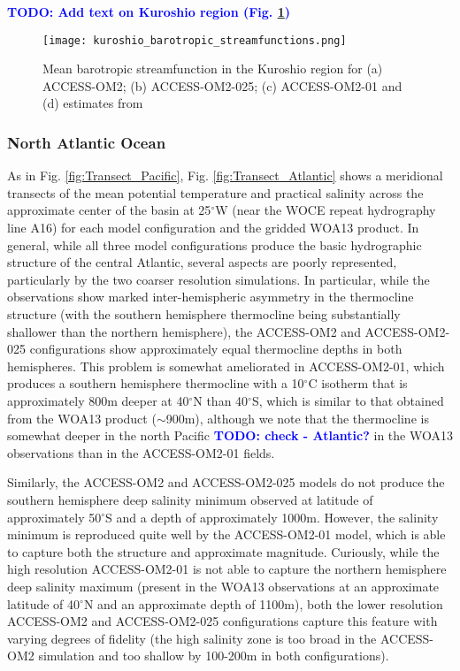 \documentclass[gmd, manuscript]{copernicus}
\newcommand{\TODO}[1]{\textcolor{blue}{\textsf{\textbf{TODO: #1}}}}
\begin{document}
\TODO{Add text on Kuroshio region (Fig. \ref{fig:kuroshio})}


\begin{figure}[t]
\texttt{[image: kuroshio\_barotropic\_streamfunctions.png]}
\caption{Mean barotropic streamfunction in the Kuroshio region for (a)  ACCESS-OM2; (b) ACCESS-OM2-025; (c) ACCESS-OM2-01 and (d) estimates from \citep{cdvo:2016} \label{fig:kuroshio}}
\end{figure}

\subsubsection{North Atlantic Ocean}

As in Fig. \ref{fig:Transect_Pacific}, Fig. \ref{fig:Transect_Atlantic} shows a meridional transects of the mean potential temperature and practical salinity across the approximate center of the basin at 25$^{\circ}$W (near the WOCE repeat hydrography line A16) for each model configuration and the gridded WOA13 product. In general, while all three model configurations produce the basic hydrographic structure of the central Atlantic, several aspects are poorly represented, particularly by the two coarser resolution simulations. In particular, while the observations show marked inter-hemispheric asymmetry in the thermocline structure (with the southern hemisphere thermocline being substantially shallower than the northern hemisphere), the ACCESS-OM2 and ACCESS-OM2-025 configurations show approximately equal thermocline depths in both hemispheres. This problem is somewhat ameliorated in ACCESS-OM2-01, which produces a southern hemisphere thermocline with a 10$^{\circ}$C isotherm that is approximately 800m deeper at 40$^{\circ}$N than 40$^{\circ}$S, which is similar to that obtained from the WOA13 product ($\sim$900m), although we note that the thermocline is somewhat deeper in the north Pacific \TODO{check - Atlantic?} in the WOA13 observations than in the ACCESS-OM2-01 fields. 

Similarly, the ACCESS-OM2 and ACCESS-OM2-025 models do not produce the southern hemisphere deep salinity minimum observed at latitude of approximately 50$^{\circ}$S and a depth of approximately 1000m. However, the salinity minimum is reproduced quite well by the ACCESS-OM2-01 model, which is able to capture both the structure and approximate magnitude. Curiously, while the high resolution ACCESS-OM2-01 is not able to capture the northern hemisphere deep salinity maximum (present in the WOA13 observations at an approximate latitude of 40$^{\circ}$N and an approximate depth of 1100m), both the lower resolution ACCESS-OM2 and ACCESS-OM2-025 configurations capture this feature with varying degrees of fidelity (the high salinity zone is too broad in the ACCESS-OM2 simulation and too shallow by 100-200m in both configurations).
\end{document}
